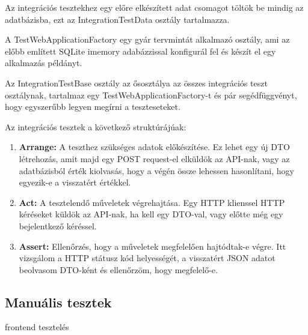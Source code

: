 Az integrációs tesztekhez egy előre elkészített adat csomagot töltök be mindig az adatbázisba, ezt az IntegrationTestData osztály tartalmazza.

A TestWebApplicationFactory egy gyár tervmintát alkalmazó osztály, ami az előbb említett SQLite imemory adabázzissal konfigurál fel és készít el egy alkalmazás példányt.

Az IntegrationTestBase osztály az ősosztálya az összes integrációs teszt osztálynak, tartalmaz egy TestWebApplicationFactory-t és pár segédfüggvényt, hogy egyszerűbb legyen megírni a teszteseteket.

Az integrációs tesztek a következő struktúrájúak:
\begin{enumerate}
	\item \textbf{Arrange:} A teszthez szükséges adatok előkészítése. Ez lehet egy új DTO létrehozás, amit majd egy POST request-el elküldök az API-nak, vagy az adatbázisból érték kiolvasás, hogy a végén össze lehessen hasonlítani, hogy egyezik-e a visszatért értékkel.
	\item \textbf{Act:} A tesztelendő műveletek végrehajtása. Egy HTTP klienssel HTTP kéréseket küldök az API-nak, ha kell egy DTO-val, vagy előtte még egy bejelentkező kéréssel.
	\item \textbf{Assert:} Ellenőrzés, hogy a műveletek megfelelően hajtódtak-e végre. Itt vizsgálom a HTTP státusz kód helyességét, a visszatért JSON adatot beolvasom DTO-ként és ellenőrzöm, hogy megfelelő-e.
\end{enumerate}

\subsection{Manuális tesztek}
frontend tesztelés



























